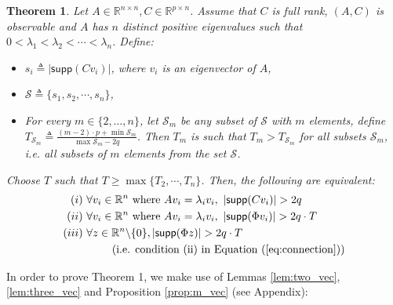 \documentclass[journal]{IEEEtran}
\newtheorem{thm}{\bf{Theorem}}
\begin{document}
\begin{thm} Let $A \in \mathbb{R}^{n\times n}, C \in \mathbb{R}^{p\times n}$. Assume that $C$ is full rank, $(A,C)$ is observable and $A$ has $n$ distinct positive eigenvalues such that $0 < \lambda_1 < \lambda_2 < \cdots < \lambda_n$. Define:
\begin{itemize}
\item
$s_i \triangleq \lvert \textsf{supp} (Cv_i) \vert$, where $v_i$ is an eigenvector of $A$, \item
$\mathcal{S} \triangleq \{ s_1, s_2, \cdots, s_n \}$,
\item
For every $m \in \{2, \ldots, n\}$, let $\mathcal{S}_m$ be any subset of $\mathcal{S}$ with $m$ elements, define $T_{\mathcal{S}_m} \triangleq \frac {  (m-2) \cdot p + \min \mathcal{S}_m } {\max \mathcal{S}_m - 2q }$.
Then $T_m$ is such that $T_m > T_{\mathcal{S}_m}$ for all subsets $\mathcal{S}_m$, i.e. all subsets of $m$ elements from the set $\mathcal{S}$.
\end{itemize}
Choose $T$ such that  $T \ge \max \{ T_2, \cdots, T_n \}$.
Then, the following are equivalent:
\begin{equation}
\begin{aligned} 
 (i)  &~\forall v_i \in \mathbb{R}^n \text{ where } Av_i =\lambda_i v_i, ~ \lvert \textsf{supp}(Cv_i) \rvert > 2q  \\
  (ii)  &~\forall v_i \in \mathbb{R}^n \text{ where } Av_i =\lambda_i v_i,  ~\lvert \textsf{supp} (\Phi v_i) \rvert > 2q \cdot T  \\
  (iii) &~  \forall z \in \mathbb{R}^n\backslash \{0 \}, \lvert \textsf{supp} (\Phi z) \rvert > 2 q \cdot T \\&~~~~~~~~ \text{(i.e. condition (ii) in Equation (\ref{eq:connection}))} \nonumber 
\label{eq:new_condition}
\end{aligned}
\end{equation}
\end{thm}
\noindent
In order to prove Theorem 1, we make use of Lemmas \ref{lem:two_vec}, \ref{lem:three_vec} and Proposition \ref{prop:m_vec} (see Appendix): 
\end{document}
